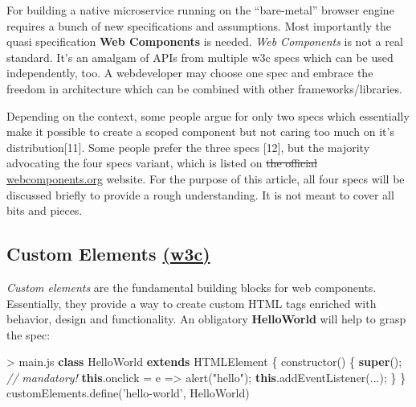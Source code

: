 \documentclass[]{assets/latex/ieee}
\newenvironment{Shaded}{}{}
\newcommand{\KeywordTok}[1]{\textcolor[rgb]{0.00,0.44,0.13}{\textbf{{#1}}}}
\newcommand{\StringTok}[1]{\textcolor[rgb]{0.25,0.44,0.63}{{#1}}}
\newcommand{\CommentTok}[1]{\textcolor[rgb]{0.38,0.63,0.69}{\textit{{#1}}}}
\newcommand{\VariableTok}[1]{\textcolor[rgb]{0.10,0.09,0.49}{{#1}}}
\newcommand{\OperatorTok}[1]{\textcolor[rgb]{0.40,0.40,0.40}{{#1}}}
\newcommand{\AttributeTok}[1]{\textcolor[rgb]{0.49,0.56,0.16}{{#1}}}
\newcommand{\NormalTok}[1]{{#1}}
\begin{document}
For building a native microservice running on the ``bare-metal'' browser
engine requires a bunch of new specifications and assumptions. Most
importantly the quasi specification \textbf{Web Components} is needed.
\emph{Web Components} is not a real standard. It's an amalgam of APIs
from multiple w3c specs which can be used independently, too. A
webdeveloper may choose one spec and embrace the freedom in architecture
which can be combined with other frameworks/libraries.

Depending on the context, some people argue for only two specs which
essentially make it possible to create a scoped component but not caring
too much on it's distribution{[}11{]}. Some people prefer the three
specs {[}12{]}, but the majority advocating the four specs variant,
which is listed on \sout{the official}
\href{http://webcomponents.org}{webcomponents.org} website. For the
purpose of this article, all four specs will be discussed briefly to
provide a rough understanding. It is not meant to cover all bits and
pieces.

\subsection{\texorpdfstring{Custom Elements
\href{http://w3c.github.io/webcomponents/spec/custom/}{(w3c)}}{Custom Elements (w3c)}}\label{custom-elements-w3c}

\emph{Custom elements} are the fundamental building blocks for web
components. Essentially, they provide a way to create custom HTML tags
enriched with behavior, design and functionality. An obligatory
\textbf{HelloWorld} will help to grasp the spec:

\begin{Shaded}
\begin{Highlighting}[]
\OperatorTok{>} \VariableTok{main}\NormalTok{.}\AttributeTok{js}
\KeywordTok{class} \NormalTok{HelloWorld }\KeywordTok{extends} \NormalTok{HTMLElement }\OperatorTok{\{}
 \AttributeTok{constructor}\NormalTok{() }\OperatorTok{\{}
  \KeywordTok{super}\NormalTok{()}\OperatorTok{;} \CommentTok{// mandatory!}
  \KeywordTok{this}\NormalTok{.}\AttributeTok{onclick} \OperatorTok{=} \NormalTok{e }\OperatorTok{=>} \AttributeTok{alert}\NormalTok{(}\StringTok{"hello"}\NormalTok{)}\OperatorTok{;}
  \KeywordTok{this}\NormalTok{.}\AttributeTok{addEventListener}\NormalTok{(...)}\OperatorTok{;}
 \OperatorTok{\}}
\OperatorTok{\}}
\VariableTok{customElements}\NormalTok{.}\AttributeTok{define}\NormalTok{(}\StringTok{'hello-world'}\OperatorTok{,} \NormalTok{HelloWorld)}
\end{Highlighting}
\end{Shaded}
\end{document}
